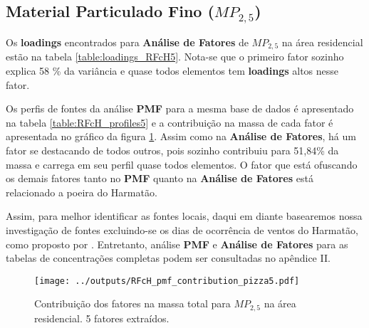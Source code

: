 \subsection{Material Particulado Fino ($MP_{2,5}$)}

Os \textbf{loadings} encontrados para \textbf{Análise de Fatores} de $MP_{2,5}$
na área residencial estão na tabela \ref{table:loadings_RFcH5}. 
Nota-se que o primeiro fator sozinho explica 58 \% da variância e quase todos 
elementos tem \textbf{loadings} altos nesse fator. 

\begin{table}[H]
  
  \caption{Análise de Fatores para $MP_{2,5}$ na região residencial.
           Rotação varimax - 5 fatores retidos (n=197).
           (\textcolor{red}{h} : Comunalidade; 
           \textcolor{red}{S=1-h} : Singularidade; 
           \textcolor{red}{C} : Complexidade.)
           \label{table:loadings_RFcH5}}
\end{table}

Os perfis de fontes da análise \textbf{PMF} para a mesma base de dados é 
apresentado na tabela \ref{table:RFcH_profiles5} e a contribuição na massa
de cada fator é apresentada no gráfico da figura \ref{table:RFcH_contribution5}.
Assim como na \textbf{Análise de Fatores}, há um fator se destacando de todos
outros, pois sozinho contribuiu para 51,84\% da massa e carrega em seu perfil
quase todos elementos. O fator que está ofuscando os demais fatores
tanto no \textbf{PMF} quanto na \textbf{Análise de Fatores} está relacionado
a poeira do Harmatão.
 
Assim, para melhor identificar as fontes locais, daqui em diante basearemos 
nossa investigação de fontes excluindo-se os dias de ocorrência de ventos do 
Harmatão, como proposto por \cite{aboh2009}. Entretanto, análise \textbf{PMF} e 
\textbf{Análise de Fatores} para as tabelas de concentrações completas podem
ser consultadas no apêndice II. 

\begin{landscape}
  \begin{figure}
    \centering
    \begin{minipage}[b]{0.45\linewidth}
      \texttt{[image: ../outputs/RFcH\_pmf\_contribution\_pizza5.pdf]}
      \caption{Contribuição dos fatores na massa total para $MP_{2,5}$ na área
               residencial. 5 fatores extraídos.
               \label{table:RFcH_contribution5}}
    \end{minipage}%
    \hspace{0.5cm}
    \begin{minipage}[b]{0.45\linewidth}
      
    \end{minipage}
  \end{figure}
\end{landscape}


